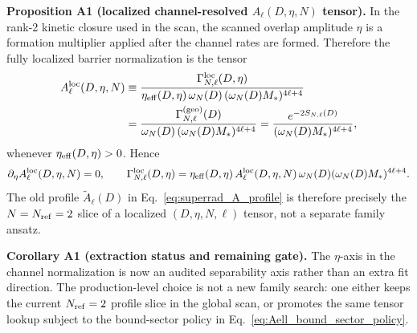 \documentclass[aps,prd,onecolumn,notitlepage,nofootinbib,superscriptaddress,11pt,floatfix]{revtex4-2}
\begin{document}
\medskip\noindent\textbf{Proposition A1 (localized channel-resolved \(A_\ell(D,\eta,N)\) tensor).}
In the rank-2 kinetic closure used in the scan, the scanned overlap amplitude \(\eta\) is a formation multiplier applied after the channel rates are formed.  Therefore the fully localized barrier normalization is the tensor
\begin{equation}
\begin{aligned}
A_\ell^{\rm loc}(D,\eta,N)
&\equiv
\frac{\Gamma_{N,\ell}^{\rm loc}(D,\eta)}
{\eta_{\rm eff}(D,\eta)\,\omega_N(D)\,(\omega_N(D)M_*)^{4\ell+4}}\\
&=
\frac{\Gamma_{N,\ell}^{\rm(geo)}(D)}
{\omega_N(D)\,(\omega_N(D)M_*)^{4\ell+4}}
=
\frac{e^{-2S_{N,\ell}(D)}}{(\omega_N(D)M_*)^{4\ell+4}},
\end{aligned}
\label{eq:Aell_local_tensor}
\end{equation}
whenever \(\eta_{\rm eff}(D,\eta)>0\).  Hence
\begin{equation}
\partial_\eta A_\ell^{\rm loc}(D,\eta,N)=0,
\qquad
\Gamma_{N,\ell}^{\rm loc}(D,\eta)
=\eta_{\rm eff}(D,\eta)\,
A_\ell^{\rm loc}(D,\eta,N)\,\omega_N(D)(\omega_N(D)M_*)^{4\ell+4}.
\label{eq:Aell_eta_separable}
\end{equation}
The old profile \(\tilde A_\ell(D)\) in Eq.~\eqref{eq:superrad_A_profile} is therefore precisely the \(N=N_{\rm ref}=2\) slice of a localized \((D,\eta,N,\ell)\) tensor, not a separate family ansatz.

\medskip\noindent\textbf{Corollary A1 (extraction status and remaining gate).}
The \(\eta\)-axis in the channel normalization is now an audited separability axis rather than an extra fit direction.  The production-level choice is not a new family search: one either keeps the current \(N_{\rm ref}=2\) profile slice in the global scan, or promotes the same tensor lookup subject to the bound-sector policy in Eq.~\eqref{eq:Aell_bound_sector_policy}.
\end{document}
